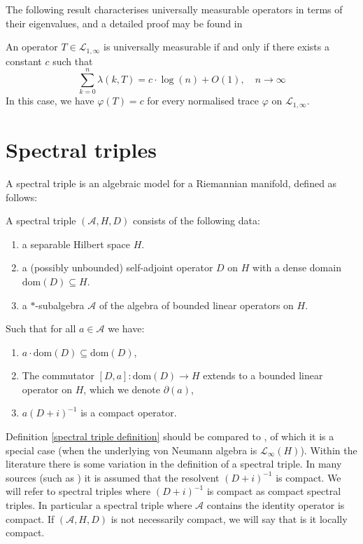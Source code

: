     The following result characterises universally measurable operators in terms of their eigenvalues, and a detailed proof may be found in \cite[Theorem 10.1.3(g)]{LSZ}
    \begin{thm}\label{universal measurability criterion} 
        An operator $T\in\mathcal{L}_{1,\infty}$ is universally measurable if and only if there exists a constant $c$ such that
        $$\sum_{k=0}^n\lambda(k,T)=c\cdot\log(n)+O(1), \quad n\to\infty$$
        In this case, we have $\varphi(T)=c$ for every normalised trace $\varphi$ on $\mathcal{L}_{1,\infty}.$
    \end{thm}

\section{Spectral triples}\label{spectral triple subsection}
    A spectral triple is an algebraic model for a Riemannian manifold, defined as follows:
    \begin{defi}\label{spectral triple definition}
        A spectral triple $(\mathcal{A},H,D)$ consists of the following data:
        \begin{enumerate}[{\rm (a)}]
            \item{} a separable Hilbert space $H$.
            \item{} a (possibly unbounded) self-adjoint operator $D$ on $H$ with a dense domain $\mathrm{dom}(D)\subseteq H$.
            \item{} a $*$-subalgebra $\mathcal{A}$ of the algebra of bounded linear operators on $H$.
        \end{enumerate}
        Such that for all $a \in \mathcal{A}$ we have:
        \begin{enumerate}
            \item{} $a\cdot \mathrm{dom}(D) \subseteq \mathrm{dom}(D)$,
            \item{} The commutator $[D,a]:\mathrm{dom}(D)\to H$ extends to a bounded linear operator on $H$, which we denote $\partial(a)$,
            \item{} $a(D+i)^{-1}$ is a compact operator.
        \end{enumerate}
    \end{defi}
        
    \begin{rem}
        Definition \ref{spectral triple definition} should be compared to \cite[Definition 3.1]{CGRS2}, of which it is a special case (when the underlying von Neumann algebra is $\mathcal{L}_{\infty}(H)$). 
        Within the literature there is some variation in the definition of a spectral triple. In many sources (such as \cite[Definition 9.16]{GVF}) it is assumed that the resolvent $(D+i)^{-1}$ is compact.
        We will refer to spectral triples where $(D+i)^{-1}$ is compact as compact spectral triples. In particular a spectral triple where $\mathcal{A}$ contains the identity operator is compact. 
        If $(\mathcal{A},H,D)$ is not necessarily compact, we will say that is it locally compact.
    \end{rem}
    
